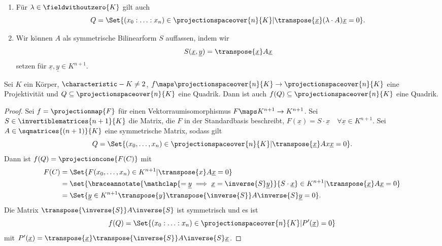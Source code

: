 \begin{bemerkung*}
  \begin{enumerate}
    \item Für \( \lambda\in \fieldwithoutzero{K} \) gilt auch 
    \begin{equation*}
      Q=\Set{(x_0:\dotsc:x_n)\in \projectionspaceover{n}{K}|\transpose{\underline{x}}(\lambda\cdot A)\underline{x}=0}.
    \end{equation*}
    \item Wir können \( A \) als symmetrische Bilinearform \( S \) auffassen, indem wir
    \begin{equation*}
      S(\underline{x},\underline{y})=\transpose{\underline{x}}A\underline{x}
    \end{equation*}
    setzen für \( \underline{x},\underline{y}\in K^{n+1} \).
  \end{enumerate}
\end{bemerkung*}
\begin{lemma}\label{projektivitaet_projektive_quadriken_auf_projektive_quadriken}
  Sei \( K \) ein Körper, \( \characteristic-{K}\neq 2 \), \( f\maps \projectionspaceover{n}{K}\to\projectionspaceover{n}{K} \) eine Projektivität und \( Q\subseteq \projectionspaceover{n}{K} \) eine Quadrik. Dann ist auch \( f(Q)\subseteq \projectionspaceover{n}{K} \) eine Quadrik.
\end{lemma}
\begin{proof}
  Sei \( f=\projectionmap{F} \) für einen Vektorraumisomorphismus \( F\maps K^{n+1}\to K^{n+1} \). Sei \( S\in \invertiblematrices{n+1}{K} \) die Matrix, die \( F \) in der Standardbasis beschreibt, \dh \( F(\underline{x})=S\cdot \underline{x}\quad \forall \underline{x}\in K^{n+1} \). Sei \( A\in \sqmatrices{(n+1)}{K} \) eine symmetrische Matrix, sodass gilt
  \begin{equation*}
    Q=\Set{(x_0,\dotsc,x_n)\in \projectionspaceover{n}{K}|\transpose{\underline{x}}Ax\underline{x}=0}.
  \end{equation*}
  Dann ist \( f(Q)=\projectioncone{F(C)} \) mit
  \begin{align*}
    F(C)&=\Set{F(x_0,\dotsc,x_n)\in K^{n+1}|\transpose{x}A\underline{x}=0}\\
    &=\set{\braceannotate{\mathclap{=\underline{y}\implies \underline{x}=\inverse{S}\underline{y}}}{S\cdot\underline{x}}\in K^{n+1}|\transpose{\underline{x}}A\underline{x}=0}\\
    &=\Set{\underline{y}\in K^{n+1}\transpose{y}\transpose{\inverse{S}}A\inverse{S}\underline{y}=0}.
  \end{align*}
  Die Matrix \( \transpose{\inverse{S}}A\inverse{S} \) ist symmetrisch und es ist
  \begin{equation*}
    f(Q)=\Set{(x_0:\dotsc:x_n)\in \projectionspaceover{n}{K}|P'(\underline{x})=0}
  \end{equation*}
  mit \( P'(\underline{x})=\transpose{\underline{x}}\transpose{\inverse{S}}A\inverse{S}\underline{x} \).
\end{proof}
